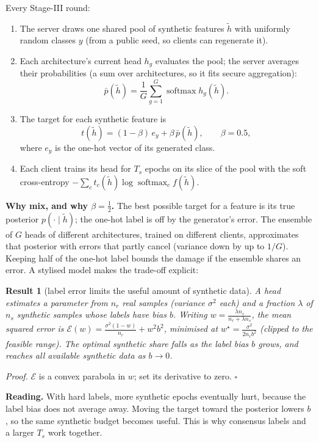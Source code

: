 \documentclass[11pt]{article}
\theoremstyle{plain}
\newtheorem{result}{Result}
\theoremstyle{definition}
\newcommand{\softmax}{\operatorname{softmax}}
\begin{document}
\begin{steps}
Every Stage-III round:
\begin{enumerate}
\item The server draws one shared pool of synthetic features $\tilde h$ with uniformly random classes $y$ (from a public
seed, so clients can regenerate it).
\item Each architecture's current head $h_g$ evaluates the pool; the server averages their probabilities (a sum over
architectures, so it fits secure aggregation):
\[
\bar p(\tilde h)=\frac1G\sum_{g=1}^{G}\softmax h_g(\tilde h).
\]
\item The target for each synthetic feature is
\[
t(\tilde h)=(1-\beta)\,e_y+\beta\,\bar p(\tilde h),\qquad\beta=0.5,
\]
where $e_y$ is the one-hot vector of its generated class.
\item Each client trains its head for $T_s$ epochs on its slice of the pool with the soft cross-entropy
$-\sum_ct_c(\tilde h)\log\softmax_c f(\tilde h)$.
\end{enumerate}
\end{steps}

\textbf{Why mix, and why $\beta=\tfrac12$.} The best possible target for a feature is its true posterior
$p(\cdot\mid\tilde h)$; the one-hot label is off by the generator's error. The ensemble of $G$ heads of different
architectures, trained on different clients, approximates that posterior with errors that partly cancel (variance down
by up to $1/G$). Keeping half of the one-hot label bounds the damage if the ensemble shares an error. A stylised model
makes the trade-off explicit:

\begin{result}[label error limits the useful amount of synthetic data]\label{res:budget}
A head estimates a parameter from $n_r$ real samples (variance $\sigma^2$ each) and a fraction $\lambda$ of $n_s$
synthetic samples whose labels have bias $b$. Writing $w=\frac{\lambda n_s}{n_r+\lambda n_s}$, the mean squared error is
$\mathcal E(w)=\frac{\sigma^2(1-w)}{n_r}+w^2b^2$, minimised at $w^\star=\frac{\sigma^2}{2n_rb^2}$ (clipped to the
feasible range). The optimal synthetic share falls as the label bias $b$ grows, and reaches all available synthetic
data as $b\to0$.
\end{result}
\emph{Proof.} $\mathcal E$ is a convex parabola in $w$; set its derivative to zero. $\square$

\textbf{Reading.} With hard labels, more synthetic epochs eventually hurt, because the label bias does not average
away. Moving the target toward the posterior lowers $b$, so the same synthetic budget becomes useful. This is why
consensus labels and a larger $T_s$ work together.
\end{document}
